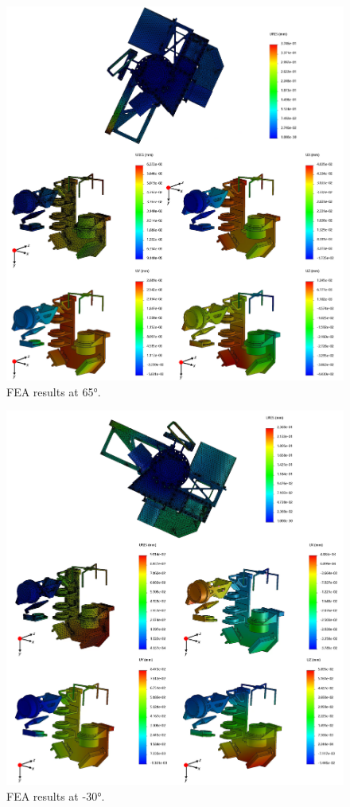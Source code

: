 \documentclass{report}
\begin{document}
\clearpage

\begin{figure}
\centering
\includegraphics[width=1.1\linewidth]{figures/AllFEA65deg.png}
\caption{FEA results at 65°.}
\label{figure:FEAD1c}
\end{figure}

\clearpage

\begin{figure}
\centering
\includegraphics[width=1.1\linewidth]{figures/AllFEA-30deg.png}
\caption{FEA results at -30°.}
\label{figure:FEAD1d}
\end{figure}
\end{document}
